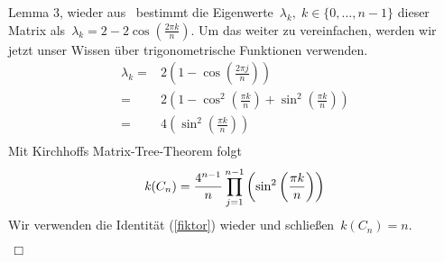 Lemma 3, wieder aus~\cite{daoud_2014} bestimmt die Eigenwerte $\,\lambda_k,\; k \in \{0,\ldots,n-1\}$
dieser Matrix als $\,\lambda_k = 2-2\cos {\left(\frac{2\pi k}{n}\right)}$.\; 
Um das weiter zu vereinfachen, werden wir jetzt unser Wissen über trigonometrische Funktionen verwenden.
\begin{equation}
\begin{split}
 \lambda_k={} & 2 \left(1-\cos \left(\frac{2\pi j}{n}\right)\right)\\
 = {}&2 \left( 1 - \cos^2\left(\frac{\pi k}{n}\right)+\sin^2\left(\frac{\pi k}{n}\right) \right)\\
 = {}& 4 \left(\sin^2\left(\frac{\pi k}{n}\right) \right)\\
\end{split}
\label{ewc}
\end{equation}
Mit Kirchhoffs Matrix-Tree-Theorem folgt
\begin{equation*}
 \mathit{k}(C_n)=\frac{4^{n-1}}{n}\prod_{j=1}^{n-1} \left(\sin^2\left(\frac{\pi k}{n}\right) \right)\\
\end{equation*}
Wir verwenden die Identität (\ref{fiktor}) wieder und schließen $\,\mathit{k}(C_n)=n$.\; 
\begin{flushright} $\,\Box\,$ \end{flushright} 
